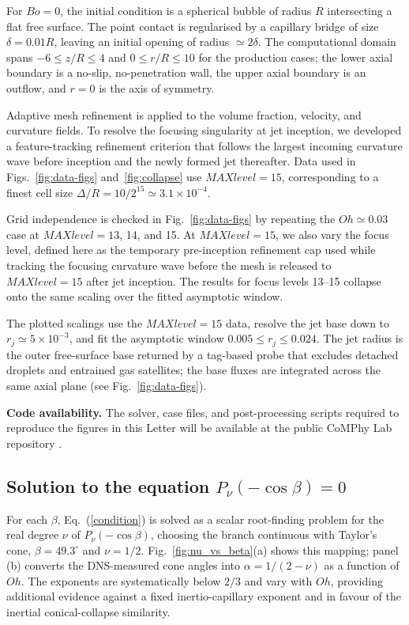 \documentclass[twocolumn]{revtex4-2}
\begin{document}
For $Bo=0$, the initial condition is a spherical bubble of radius $R$ intersecting a flat free surface. The point contact is regularised by a capillary bridge of size $\delta=0.01R$, leaving an initial opening of radius $\simeq2\delta$. The computational domain spans $-6\le z/R\le4$ and $0\le r/R\le10$ for the production cases; the lower axial boundary is a no-slip, no-penetration wall, the upper axial boundary is an outflow, and $r=0$ is the axis of symmetry.

Adaptive mesh refinement is applied to the volume fraction, velocity, and curvature fields. To resolve the focusing singularity at jet inception, we developed a feature-tracking refinement criterion that follows the largest incoming curvature wave before inception and the newly formed jet thereafter. Data used in Figs.~\ref{fig:data-figs} and~\ref{fig:collapse} use $MAXlevel=15$, corresponding to a finest cell size $\Delta/R=10/2^{15}\simeq3.1\times10^{-4}$.

Grid independence is checked in Fig.~\ref{fig:data-figs} by repeating the $Oh\simeq0.03$ case at $MAXlevel=13$, 14, and 15. At $MAXlevel=15$, we also vary the focus level, defined here as the temporary pre-inception refinement cap used while tracking the focusing curvature wave before the mesh is released to $MAXlevel=15$ after jet inception. The results for focus levels 13--15 collapse onto the same scaling over the fitted asymptotic window.

The plotted scalings use the $MAXlevel=15$ data, resolve the jet base down to $r_j\simeq5\times10^{-3}$, and fit the asymptotic window $0.005\le r_j\le0.024$. The jet radius is the outer free-surface base returned by a tag-based probe that excludes detached droplets and entrained gas satellites; the base fluxes are integrated across the same axial plane (see Fig.~\ref{fig:data-figs}).

\noindent\textbf{Code availability.} The solver, case files, and post-processing scripts required to reproduce the figures in this Letter will be available at the public CoMPhy Lab repository \cite{BurstingBubbleCode}.

\subsection{\texorpdfstring{Solution to the equation $P_\nu(-\cos\beta) = 0$}{Solution to the equation Pnu(-cos beta) = 0}}

For each $\beta$, Eq.~(\ref{condition}) is solved as a scalar root-finding problem for the real degree $\nu$ of $P_\nu(-\cos\beta)$, choosing the branch continuous with Taylor's cone, $\beta=49.3^\circ$ and $\nu=1/2$. Fig.~\ref{fig:nu_vs_beta}(a) shows this mapping; panel (b) converts the DNS-measured cone angles into $\alpha=1/(2-\nu)$ as a function of $Oh$. The exponents are systematically below $2/3$ and vary with $Oh$, providing additional evidence against a fixed inertio-capillary exponent and in favour of the inertial conical-collapse similarity.
\end{document}
